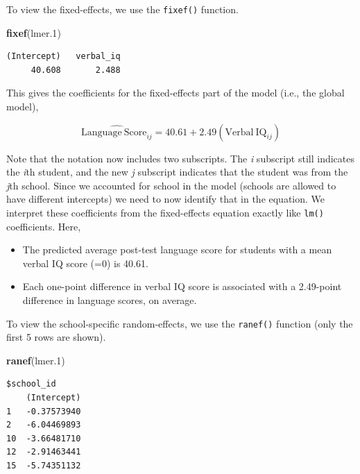 \documentclass[]{book}
\newenvironment{Shaded}{\begin{snugshade}}{\end{snugshade}}
\newcommand{\FloatTok}[1]{\textcolor[rgb]{0.00,0.00,0.81}{#1}}
\newcommand{\KeywordTok}[1]{\textcolor[rgb]{0.13,0.29,0.53}{\textbf{#1}}}
\newcommand{\NormalTok}[1]{#1}
\providecommand{\tightlist}{%
  \setlength{\itemsep}{0pt}\setlength{\parskip}{0pt}}
\begin{document}
To view the fixed-effects, we use the \texttt{fixef()} function.

\begin{Shaded}
\begin{Highlighting}[]
\KeywordTok{fixef}\NormalTok{(lmer}\FloatTok{.1}\NormalTok{)}
\end{Highlighting}
\end{Shaded}

\begin{verbatim}
(Intercept)   verbal_iq 
     40.608       2.488 
\end{verbatim}

This gives the coefficients for the fixed-effects part of the model (i.e., the global model),

\[
\hat{\mathrm{Language~Score}_{ij}} = 40.61 + 2.49(\mathrm{Verbal~IQ}_{ij})
\]

Note that the notation now includes two subscripts. The \emph{i} subscript still indicates the \emph{i}th student, and the new \emph{j} subscript indicates that the student was from the \emph{j}th school. Since we accounted for school in the model (schools are allowed to have different intercepts) we need to now identify that in the equation. We interpret these coefficients from the fixed-effects equation exactly like \texttt{lm()} coefficients. Here,

\begin{itemize}
\tightlist
\item
  The predicted average post-test language score for students with a mean verbal IQ score (=0) is 40.61.
\item
  Each one-point difference in verbal IQ score is associated with a 2.49-point difference in language scores, on average.
\end{itemize}

To view the school-specific random-effects, we use the \texttt{ranef()} function (only the first 5 rows are shown).

\begin{Shaded}
\begin{Highlighting}[]
\KeywordTok{ranef}\NormalTok{(lmer}\FloatTok{.1}\NormalTok{)}
\end{Highlighting}
\end{Shaded}

\begin{verbatim}
$school_id
    (Intercept)
1   -0.37573940
2   -6.04469893
10  -3.66481710
12  -2.91463441
15  -5.74351132
\end{verbatim}
\end{document}
